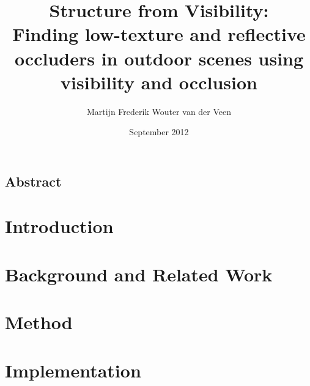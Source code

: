 \documentclass{ucl_thesis}
\title{Structure from Visibility: \\
       Finding low-texture and reflective occluders in outdoor scenes
       using visibility and occlusion}
\author{Martijn Frederik Wouter van der Veen}
\date{September 2012}
\begin{document}

\maketitle
{}
\setcounter{page}{1}
\pagestyle{plain}




\newpage
\section*{Abstract}
%



\setcounter{tocdepth}{1}
\tableofcontents
\listoffigures
\listofalgorithms
\newpage

%

\setcounter{page}{1}
\pagestyle{plain}




\chapter{Introduction}
\label{introduction}




\chapter{Background and Related Work}
\label{background}




\chapter{Method} %
\label{method}



\chapter{Implementation} %
\label{implementation}

\end{document}
